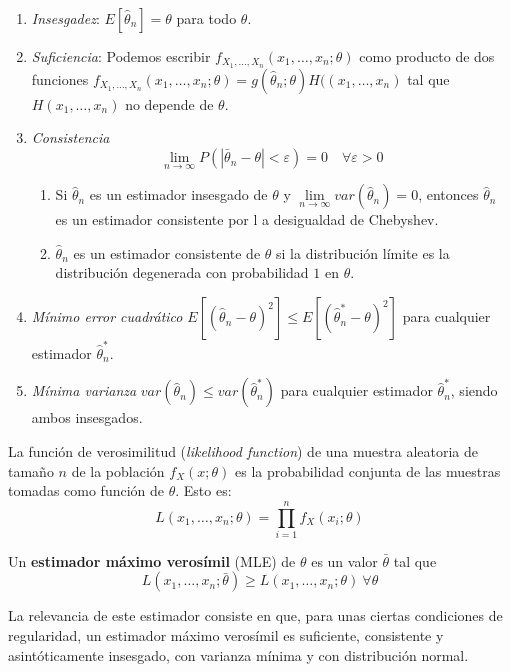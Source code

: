 	\begin{enumerate}
	\item \textit{Insesgadez}: 
			$E[\hat{\theta}_n] = \theta$ para todo $\theta$.
	\item \textit{Suficiencia}: Podemos escribir
			$f_{X_1, \dots, X_n}(x_1, \dots, x_n; \theta)$ 
			como producto de dos funciones $f_{X_1, \dots, 
			X_n}(x_1, \dots, x_n; \theta) = g(\hat{\theta}_n; 
			\theta) H((x_1, \dots, x_n)$ tal que $H(x_1, 
			\dots, x_n)$ no depende de $\theta$.
	\item \textit{Consistencia}
		\[ 
			\lim_{n \rightarrow \infty} 
				P(|\bar{\theta}_n - \theta| < \varepsilon) =
				 0 \quad 
				 \forall \varepsilon > 0 
		\]
	\begin{enumerate}
		\item Si $\hat{\theta}_n$ es un estimador insesgado 
			de $\theta$ y $\underset{n \rightarrow \infty}
			{\lim} var(\hat{\theta}_n) = 0$, entonces $
			\hat{\theta}_n$ es un estimador consistente por l
			a desigualdad de Chebyshev.
		\item $\hat{\theta}_n$ es un estimador consistente de 
			$\theta$ si la distribución límite es la 
			distribución degenerada con probabilidad $1$ en 
			$\theta$.
	\end{enumerate}
			
	\item \textit{Mínimo error cuadrático} 	
			$E[(\hat{\theta}_n - \theta)^2] \leq
			 E[(\hat{\theta}_n^* - \theta)^2]$ para cualquier 
			 estimador $\hat{\theta}_n^*$.
	\item \textit{Mínima varianza} 	$var(\hat{\theta}_n) \leq
			 var(\hat{\theta}^*_n)$ para cualquier estimador
			  $\hat{\theta}_n^*$, siendo ambos insesgados.
	\end{enumerate}
	
\begin{definicion}
	La función de verosimilitud (\textit{likelihood 
function}) de una muestra aleatoria de tamaño $n$ de la 
población $f_X(x;\theta)$ es la probabilidad conjunta de las 
muestras tomadas como función de $\theta$. Esto es:
	\[ L(x_1, \dots, x_n; \theta) = 
		\prod\limits_{i=1}^n f_X(x_i;\theta)	\]
\end{definicion}

	Un \textbf{estimador máximo verosímil} (MLE) de $\theta$ 
es un valor $\bar{\theta}$ tal que 
	\[ 
		L(x_1, \dots, x_n; \bar{\theta}) \geq 
			L(x_1, \dots, x_n; \theta) \ \forall \theta 	
	\]
	
	La relevancia de este estimador consiste en que, para 
unas ciertas condiciones de regularidad, un estimador máximo 
verosímil es suficiente, consistente y asintóticamente 
insesgado, con varianza mínima y con distribución normal.
	
